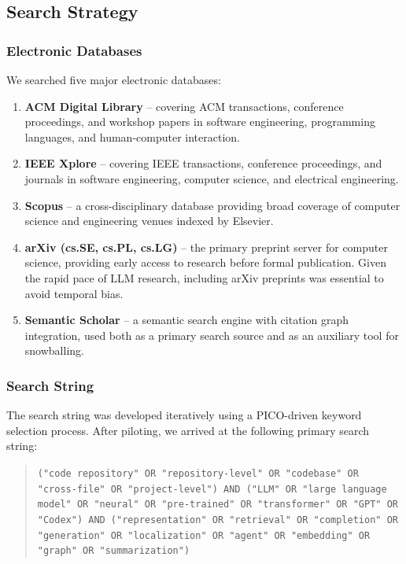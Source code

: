 \subsection{Search Strategy}
\label{subsec:search-strategy}

\subsubsection{Electronic Databases}

We searched five major electronic databases:

\begin{enumerate}[leftmargin=*, label=(\arabic*)]
  \item \textbf{ACM Digital Library} -- covering ACM transactions, conference proceedings,
    and workshop papers in software engineering, programming languages, and human-computer
    interaction.
  \item \textbf{IEEE Xplore} -- covering IEEE transactions, conference proceedings, and
    journals in software engineering, computer science, and electrical engineering.
  \item \textbf{Scopus} -- a cross-disciplinary database providing broad coverage of
    computer science and engineering venues indexed by Elsevier.
  \item \textbf{arXiv (cs.SE, cs.PL, cs.LG)} -- the primary preprint server for
    computer science, providing early access to research before formal publication. Given the
    rapid pace of LLM research, including arXiv preprints was essential to avoid temporal
    bias.
  \item \textbf{Semantic Scholar} -- a semantic search engine with citation graph integration,
    used both as a primary search source and as an auxiliary tool for snowballing.
\end{enumerate}

\subsubsection{Search String}

The search string was developed iteratively using a PICO-driven keyword selection process.
After piloting, we arrived at the following primary search string:

\begin{quote}
\small
\texttt{("code repository" OR "repository-level" OR "codebase" OR "cross-file" OR
"project-level") AND ("LLM" OR "large language model" OR "neural" OR "pre-trained" OR
"transformer" OR "GPT" OR "Codex") AND ("representation" OR "retrieval" OR "completion" OR
"generation" OR "localization" OR "agent" OR "embedding" OR "graph" OR "summarization")}
\end{quote}

